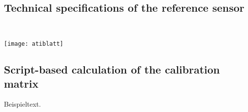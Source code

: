 \setcounter{subsection}{0}
\renewcommand\thesubsection{A\the\value{subsection}}

\subsection{Technical specifications of the reference sensor}
	\label{ch:appendix ati}
	~\vfill
	\begin{minipage}{\textwidth}
	\centering
	\texttt{[image: atiblatt]}
	\end{minipage}
	\vfill
	
\clearpage
\subsection{Script-based calculation of the calibration matrix}
	Beispieltext.